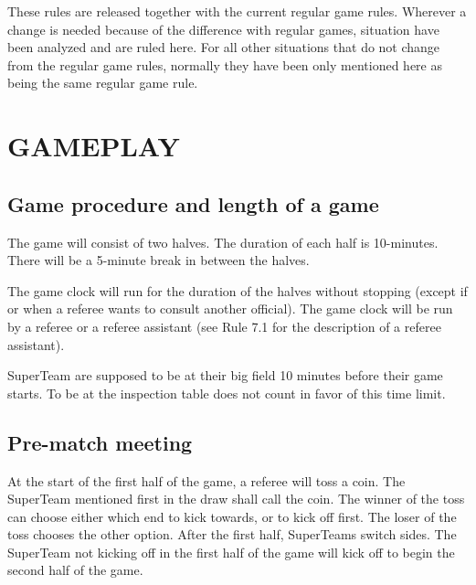 \documentclass{article}
\begin{document}
These rules are released together with the current regular game rules. Wherever
a change is needed because of the difference with regular games, situation have
been analyzed and are ruled here. For all other situations that do not change
from the regular game rules, normally they have been only mentioned here as
being the same regular game rule.

\listofchanges
\newpage

\tableofcontents

\newpage

\section{GAMEPLAY \label{ref-001}}

\subsection{Game procedure and length of a game \label{ref-002}}

The game will consist of two halves. The duration of each half is 10-minutes.
There will be a 5-minute break in between the halves.

The game clock will run for the duration of the halves without stopping (except
if or when a referee wants to consult another official). The game clock will be run
by a referee or a referee assistant (see Rule 7.1 for the description of a
referee assistant).


SuperTeam are supposed to be at their big field 10 minutes before their game
starts. To be at the inspection table does not count in favor of this time
limit.


\subsection{Pre-match meeting \label{ref-003}}

At the start of the first half of the game, a referee will toss a coin. The
SuperTeam mentioned first in the draw shall call the coin. The winner of the toss
can choose either which end to kick towards, or to kick off first. The loser of the
toss chooses the other option. After the first half, SuperTeams switch sides.
The SuperTeam not kicking off in the first half of the game will kick off to
begin the second half of the game.
\end{document}
